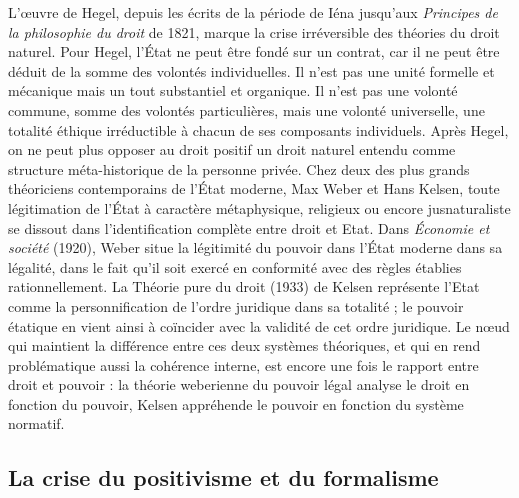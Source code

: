 L'œuvre de Hegel, depuis les écrits de
la période de Iéna jusqu'aux {\it Principes de
la philosophie du droit} de 1821, marque
la crise irréversible des théories du droit
%
naturel. Pour Hegel, l'État ne peut être
fondé sur un contrat, car il ne peut être
déduit de la somme des volontés individuelles. Il n’est pas une unité formelle et
mécanique mais un tout substantiel et
organique. Il n’est pas une volonté
commune, somme des volontés particulières, mais une volonté universelle, une
totalité éthique irréductible à chacun de
ses composants individuels. Après Hegel,
on ne peut plus opposer au droit positif
un droit naturel entendu comme structure
méta-historique de la personne privée.
Chez deux des plus grands théoriciens
contemporains de l’État moderne, Max
Weber et Hans Kelsen, toute légitimation
de l'État à caractère métaphysique, religieux ou encore jusnaturaliste se dissout
dans l'identification complète entre droit
et Etat. Dans {\it Économie et société} (1920),
Weber situe la légitimité du pouvoir dans
l’État moderne dans sa légalité, dans le
fait qu'il soit exercé en conformité avec
des règles établies rationnellement. La
Théorie pure du droit (1933) de Kelsen
représente l'Etat comme la personnification de l’ordre juridique dans sa totalité ;
le pouvoir étatique en vient ainsi à coïncider avec la validité de cet ordre juridique.
Le nœud qui maintient la différence entre
ces deux systèmes théoriques, et qui en
rend problématique aussi la cohérence
interne, est encore une fois le rapport
entre droit et pouvoir : la théorie weberienne du pouvoir légal analyse le droit en
fonction du pouvoir, Kelsen appréhende
le pouvoir en fonction du système normatif.

\subsection{La crise du positivisme et du formalisme}

